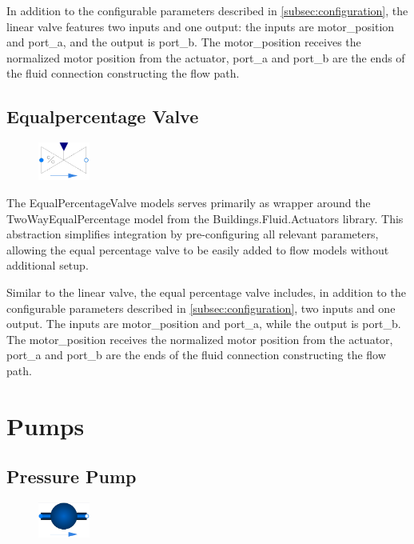 \documentclass[we,final,11pt,oneside,openany]{uantwerpenbamathesis}
\begin{document}
In addition to the configurable parameters described in \autoref{subsec:configuration}, the linear valve features two inputs and one output: the inputs are motor\_position and port\_a, and the output is port\_b.
The motor\_position receives the normalized motor position from the actuator, port\_a and port\_b are the ends of the fluid connection constructing the flow path.

\newpage

\subsection{Equalpercentage Valve}
\label{subsec:equalpercentage-valve}

\begin{figure}
    \centering
    \includegraphics[width=0.15\textwidth]{Images/components/equi-valve}
\end{figure}

The EqualPercentageValve models serves primarily as wrapper around the TwoWayEqualPercentage model from the Buildings.Fluid.Actuators library.
This abstraction simplifies integration by pre-configuring all relevant parameters, allowing the equal percentage valve to be easily added to flow models without additional setup.

Similar to the linear valve, the equal percentage valve includes, in addition to the configurable parameters described in \autoref{subsec:configuration}, two inputs and one output.
The inputs are motor\_position and port\_a, while the output is port\_b.
The motor\_position receives the normalized motor position from the actuator, port\_a and port\_b are the ends of the fluid connection constructing the flow path.

\section{Pumps}
\label{sec:pumps}

\subsection{Pressure Pump}
\label{subsec:pressure-pump}

\begin{figure}
    \centering
    \includegraphics[width=0.15\textwidth]{Images/components/pressure-pump}
\end{figure}
\end{document}
